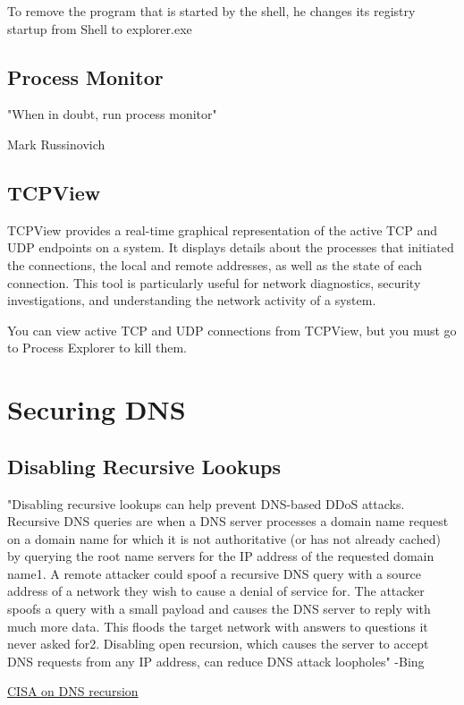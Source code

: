 \documentclass{article}
\begin{document}
To remove the program that is started by the shell, he changes its registry startup from 
Shell to explorer.exe

\subsection{Process Monitor}
\epigraph{"When in doubt, run process monitor"}{Mark Russinovich}


\subsection{TCPView}
TCPView provides a real-time graphical representation of the active TCP and UDP endpoints on a system. 
It displays details about the processes that initiated the connections, 
the local and remote addresses, as well as the state of each connection. 
This tool is particularly useful for network diagnostics, security investigations, 
and understanding the network activity of a system.

You can view active TCP and UDP connections from TCPView, but you must go to
Process Explorer to kill them.

\section{Securing DNS}

\subsection{Disabling Recursive Lookups}
"Disabling recursive lookups can help prevent DNS-based DDoS attacks. 
Recursive DNS queries are when a DNS server processes a domain name 
request on a domain name for which it is not authoritative 
(or has not already cached) by querying the root name servers for 
the IP address of the requested domain name1. A remote attacker could 
spoof a recursive DNS query with a source address of a network they 
wish to cause a denial of service for. The attacker spoofs a query 
with a small payload and causes the DNS server to reply with much 
more data. This floods the target network with answers to questions 
it never asked for2. Disabling open recursion, which causes the server 
to accept DNS 
requests from any IP address, can reduce DNS attack loopholes" -Bing

\href{https://www.cisa.gov/sites/default/files/publications/DNS-recursion033006.pdf}{CISA on DNS recursion}
\end{document}
